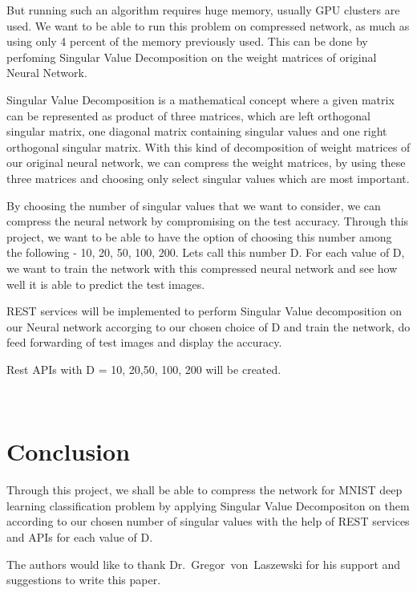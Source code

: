 But running such an algorithm requires huge memory, usually GPU clusters are
used. We want to be able to run this problem on compressed network, as much as
using only  4 percent of the memory previously used. This can be done by
perfoming Singular Value Decomposition on the weight matrices of original Neural
Network.

Singular Value Decomposition is a mathematical concept where a given matrix can
be represented as product of three matrices, which are left orthogonal singular
matrix, one diagonal matrix containing singular values and one right orthogonal
singular matrix. With this kind of decomposition of weight matrices of our
original neural network, we can compress the weight matrices, by using these
three matrices and choosing only select singular values which are most
important.

By choosing the number of singular values that we want to consider, we can
compress the neural network by compromising on the test accuracy. Through this
project, we want to be able to have the option of choosing this number among the
following  - 10, 20, 50, 100, 200. Lets call this number D. For each value of 
D, we want to train the network with this compressed neural network and see 
how well it is able to predict the test images.

REST services will be implemented to perform Singular Value decomposition on 
our Neural network accorging to our chosen choice of D and train the network,
do feed forwarding of test images and display the accuracy.

Rest APIs with D = 10, 20,50, 100, 200 will be created.

~\cite{mnist}
~\cite{svd}

\section{Conclusion}

Through this project, we shall be able to compress the network for MNIST deep 
learning classification problem by applying Singular Value Decompositon on them
according to our chosen number of singular values with the help of REST services 
and APIs for each value of D.

\begin{acks}

  The authors would like to thank Dr.~Gregor~von~Laszewski for his
  support and suggestions to write this paper.

\end{acks}


 

